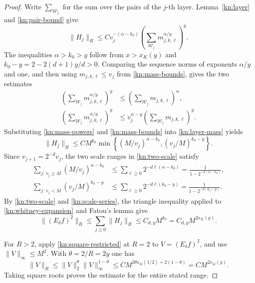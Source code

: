 \documentclass[11pt]{article}
\numberwithin{equation}{section}
\newcommand{\norm}[1]{\lVert #1\rVert}
\begin{document}
\begin{proof}
Write \(\sum_{\mathcal W_j}\) for the sum over the pairs of the
\(j\)-th layer. Lemma~\ref{kn:layer} and \eqref{kn:pair-bound} give
\begin{equation}\label{kn:layer-mass}
 \norm{H_j}_R
 \le C v_j^{-(\alpha-k_0)}
      \left(\sum_{\mathcal W_j}m_{j,k,\ell}^{\alpha/y}\right)^y .
\end{equation}
The inequalities \(\alpha>k_0>y\) follow from
\(x>x_K(y)\) and \(k_0-y=2-2(d+1)y/d>0\).
Comparing the sequence norms of exponents \(\alpha/y\) and one,
and then using \(m_{j,k,\ell}\le v_j\) from
\eqref{kn:mass-bounds}, gives the two estimates
\begin{equation}\label{kn:mass-powers}
 \begin{aligned}
 \left(\sum_{\mathcal W_j}m_{j,k,\ell}^{\alpha/y}\right)^y
 &\le \left(\sum_{\mathcal W_j}m_{j,k,\ell}\right)^\alpha,\\
 \left(\sum_{\mathcal W_j}m_{j,k,\ell}^{\alpha/y}\right)^y
 &\le v_j^{\alpha-y}
          \left(\sum_{\mathcal W_j}m_{j,k,\ell}\right)^y.
 \end{aligned}
\end{equation}
Substituting \eqref{kn:mass-powers} and \eqref{kn:mass-bounds}
into \eqref{kn:layer-mass} yields
\begin{equation}\label{kn:two-scale}
 \norm{H_j}_R\le C M^{k_0}
       \min\left\{(M/v_j)^{\alpha-k_0},
                    (v_j/M)^{k_0-y}\right\}.
\end{equation}
Since \(v_{j+1}=2^{-d}v_j\), the two scale ranges in
\eqref{kn:two-scale} satisfy
\begin{equation}\label{kn:scale-series}
 \begin{aligned}
 \sum_{j:\,v_j\ge M}(M/v_j)^{\alpha-k_0}
 &\le \sum_{\ell\ge0}2^{-d\ell(\alpha-k_0)}
   =\frac1{1-2^{-d(\alpha-k_0)}},\\
 \sum_{j:\,v_j<M}(v_j/M)^{k_0-y}
 &\le \sum_{\ell\ge0}2^{-d\ell(k_0-y)}
   =\frac1{1-2^{-d(k_0-y)}}.
 \end{aligned}
\end{equation}
By \eqref{kn:two-scale} and \eqref{kn:scale-series}, the triangle
inequality applied to \eqref{kn:whitney-expansion} and Fatou's lemma give
\begin{equation}\label{kn:square-restricted}
 \norm{(E_\delta f)^2}_R
 \le \sum_{j\ge0}\norm{H_j}_R
 \le C_{d,y}M^{k_0}
 =C_{d,y}M^{2x_K(y)}.
\end{equation}

For \(R>2\), apply \eqref{kn:square-restricted} at \(R=2\)
to \(V=(E_\delta f)^2\), and use \(\norm{V}_\infty\le M^2\). With
\(\theta=2/R=2y\) one has
\[
 \norm{V}_R\le \norm{V}_2^\theta\norm{V}_\infty^{1-\theta}
          \le C M^{2\theta x_K(1/2)+2(1-\theta)}
          =C M^{2x_K(y)}.
\]
Taking square roots proves the estimate for the entire stated range.
\end{proof}
\end{document}
